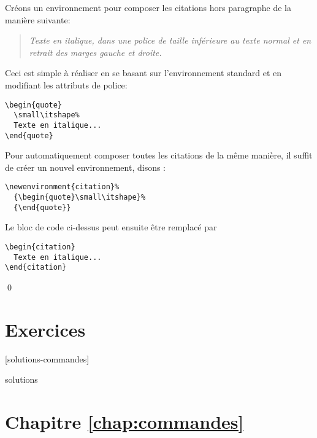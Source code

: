 \begin{exemple}
  \label{ex:commandes:citation}
  Créons un environnement pour composer les citations hors paragraphe
  de la manière suivante:
  \begin{quote}
    \small\itshape%
    Texte en italique, dans une police de taille inférieure au texte
    normal et en retrait des marges gauche et droite.
  \end{quote}
  Ceci est simple à réaliser en se basant sur l'environnement standard
   et en modifiant les attributs de police:
\begin{lstlisting}
\begin{quote}
  \small\itshape%
  Texte en italique...
\end{quote}
\end{lstlisting}

  Pour automatiquement composer toutes les citations de la même
  manière, il suffit de créer un nouvel environnement, disons
  :
\begin{lstlisting}
\newenvironment{citation}%
  {\begin{quote}\small\itshape}%
  {\end{quote}}
\end{lstlisting}
  Le bloc de code ci-dessus peut ensuite être remplacé par
\begin{lstlisting}
\begin{citation}
  Texte en italique...
\end{citation}
\end{lstlisting}
  \qed
\end{exemple}





\section{Exercices}
\label{sec:commandes:exercices}

[solutions-commandes]

\begin{Filesave}{solutions}
\section*{Chapitre \ref*{chap:commandes}}

\end{Filesave}

